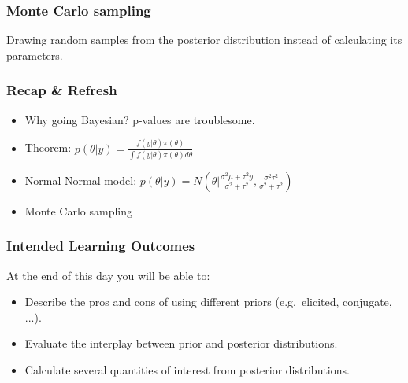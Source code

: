 \documentclass{beamer}
\newcommand{\1}{\ensuremath{\mathbf{1}}}
\begin{document}
%
%
%
\begin{frame}\frametitle{Monte Carlo sampling}
	Drawing random samples from the posterior distribution instead of calculating its parameters.
	\begin{center}
	\end{center}
\end{frame}
%
%
%
\begin{frame}\frametitle{Recap \& Refresh}
	\begin{itemize}
		\item Why going Bayesian? p-values are troublesome.
		\item Theorem: $p(\theta|y) = \frac{f(y|\theta)\pi(\theta)}{\int f(y|\theta)\pi(\theta)d\theta}$
		\item Normal-Normal model: $p(\theta|y) = N( \theta | \frac{\sigma^2\mu + \tau^2 y}{\sigma^2 + \tau^2}, \frac{\sigma^2\tau^2}{\sigma^2 + \tau^2})$
		\item Monte Carlo sampling
	\end{itemize}
\end{frame}
%
%
%
\begin{frame}\frametitle{Intended Learning Outcomes}
	At the end of this day you will be able to:
	\begin{itemize}
		\item Describe the pros and cons of using different priors (e.g.\ elicited, conjugate, ...).
		\item Evaluate the interplay between prior and posterior distributions.
		\item Calculate several quantities of interest from posterior distributions.
	\end{itemize}
\end{frame}
\end{document}
